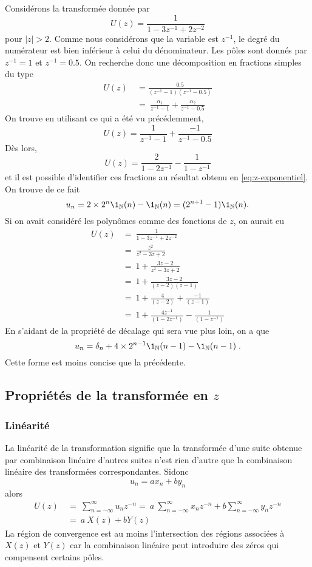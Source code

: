 \begin{proposition}
{\begin{example}
Consid\'{e}rons la transform\'{e}e donn\'{e}e par
$$
U(z)=\frac{1}{1-3z^{-1}+2z^{-2}}
$$
pour $|z|>2$. Comme nous consid\'{e}rons que la variable est $z^{-1}$, le degr\'{e} du num\'{e}rateur est bien inf\'{e}rieur \`{a} celui du d\'{e}nominateur.
Les p\^{o}les sont donn\'{e}s par $z^{-1}=1$ et $z^{-1}=0.5$. On recherche donc une d\'{e}composition en fractions simples du type
\begin{align*}
U(z)\ &= \frac{0.5}{(z^{-1}-1)(z^{-1}-0.5)} \\
      &=\ \frac{\alpha_{1}}{z^{-1}-1}+\frac{\alpha_{2}}{z^{-1}-0.5}
\end{align*}
On trouve en utilisant ce qui a \'{e}t\'{e} vu pr\'{e}c\'{e}demment,
$$
U(z)=\frac{1}{z^{-1}-1}+\frac{-1}{z^{-1}-0.5}
$$
D\`{e}s lors,
$$
U(z)=\frac{2}{1-2z^{-1}}-\frac{1}{1-z^{-1}}
$$
et il est possible d'identifier ces fractions au r\'{e}sultat obtenu en \eqref{eq:z-exponentiel}. On trouve de ce fait
$$
u_n=2\times 2^{n} \1_{\nset}(n) - \1_{\nset}(n)=(2^{n+1}-1) \1_{\nset}(n) .
$$
Si on avait consid\'{e}r\'{e} les polyn\^{o}mes comme des fonctions de $z$, on aurait eu
\begin{align*}
U(z) &=\ \frac{1}{1-3z^{-1}+2z^{-2}} \\
     &=\ \frac{z^{2}}{z^{2}-3z+2}\\
     &=\ 1+\frac{3z-2}{z^{2}-3z+2}\\
     &=\ 1+\frac{3z-2}{(z-2)(z-1)}\\
     &=\ 1+\frac{4}{(z-2)}+\frac{-1}{(z-1)}\\
     &=\ 1+\frac{4z^{-1}}{(1-2z^{-1})}-\frac{1}{(1-z^{-1})}
\end{align*}
En s'aidant de la propri\'{e}t\'{e} de d\'{e}calage qui sera vue plus loin, on a que
$$
u_n=\delta_n +4\times 2^{n-1} \1_{\nset}(n-1)-\1_{\nset}(n-1) \eqsp.
$$
Cette forme est moins concise que la pr\'{e}c\'{e}dente.
\end{example}
\subsection{Propri\'{e}t\'{e}s de la transform\'{e}e en $z$}
\subsubsection{Lin\'{e}arit\'{e}}
La lin\'{e}arit\'{e} de la transformation signifie que la transform\'{e}e d'une suite obtenue par combinaison lin\'{e}aire d'autres suites n'est rien d'autre que la combinaison lin\'{e}aire des transform\'{e}es correspondantes. Sidonc
$$
u_n=a x_n +b y_n
$$
alors
\begin{align*}
U(z)\ &=\ \sum_{n=-\infty}^{\infty} u_n z^{-n} =\ a\ \sum_{n=-\infty}^{\infty}x_{n} z^{-n}+b\sum_{n=-\infty}^{\infty} y_n z^{-n} \\
&=\ a\ X(z)+bY(z)
\end{align*}
La r\'{e}gion de convergence est au moins l'intersection des r\'{e}gions associ\'{e}es \`{a} $X(z)$ et $Y(z)$ car la combinaison lin\'{e}aire peut introduire des z\'{e}ros qui compensent certains p\^{o}les.

}
\end{proposition}
